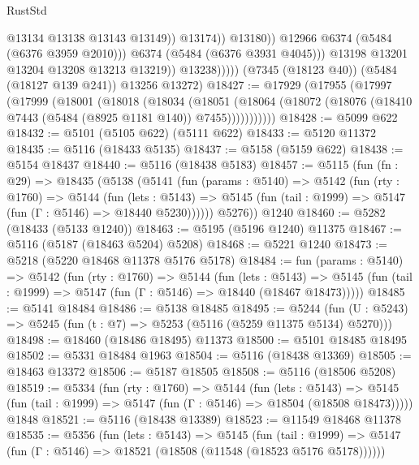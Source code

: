 \begin{lexlean}{RustStd}
\begin{coremodule}
{\begin{coremodule}
{{{{{{{{{{{{{{{{{{{{{{{{{{{{{{{                                    @13134
                                    @13138
                                    @13143
                                    @13149))
                                @13174))
                            @13180))
                        @12966
                        @6374
                        (@5484 (@6376 @3959 @2010)))
                      @6374
                      (@5484 (@6376 @3931 @4045)))
                    @13198
                    @13201
                    @13204
                    @13208
                    @13213
                    @13219))
                @13238)))))
      (@7345 (@18123 @40))
      (@5484 (@18127 @139 @241))
      @13256
      @13272)
@18427 := @17929
    (@17955
      (@17997
        (@17999
          (@18001
            (@18018
              (@18034
                (@18051
                  (@18064 (@18072 (@18076 (@18410 @7443 (@5484 (@8925 @1181 @140)) @7455)))))))))))
@18428 := @5099 @622
@18432 := @5101 (@5105 @622) (@5111 @622)
@18433 := @5120 @11372
@18435 := @5116 (@18433 @5135)
@18437 := @5158 (@5159 @622)
@18438 := @5154 @18437
@18440 := @5116 (@18438 @5183)
@18457 := @5115
    (fun (fn : @29) =>
    @18435
      (@5138
        (@5141
          (fun (params : @5140) =>
          @5142
            (fun (rty : @1760) =>
            @5144
              (fun (lets : @5143) =>
              @5145 (fun (tail : @1999) => @5147 (fun (Γ : @5146) => @18440 @5230))))))
        @5276))
    @1240
@18460 := @5282 (@18433 (@5133 @1240))
@18463 := @5195 (@5196 @1240) @11375
@18467 := @5116 (@5187 (@18463 @5204) @5208)
@18468 := @5221 @1240
@18473 := @5218 (@5220 @18468 @11378 @5176 @5178)
@18484 := fun (params : @5140) =>
  @5142
    (fun (rty : @1760) =>
    @5144
      (fun (lets : @5143) =>
      @5145 (fun (tail : @1999) => @5147 (fun (Γ : @5146) => @18440 (@18467 @18473)))))
@18485 := @5141 @18484
@18486 := @5138 @18485
@18495 := @5244
    (fun (U : @5243) => @5245 (fun (t : @7) => @5253 (@5116 (@5259 @11375 @5134) @5270)))
@18498 := @18460 (@18486 @18495) @11373
@18500 := @5101 @18485 @18495
@18502 := @5331 @18484 @1963
@18504 := @5116 (@18438 @13369)
@18505 := @18463 @13372
@18506 := @5187 @18505
@18508 := @5116 (@18506 @5208)
@18519 := @5334
    (fun (rty : @1760) =>
    @5144
      (fun (lets : @5143) =>
      @5145 (fun (tail : @1999) => @5147 (fun (Γ : @5146) => @18504 (@18508 @18473)))))
    @1848
@18521 := @5116 (@18438 @13389)
@18523 := @11549 @18468 @11378
@18535 := @5356
    (fun (lets : @5143) =>
    @5145
      (fun (tail : @1999) =>
      @5147 (fun (Γ : @5146) => @18521 (@18508 (@11548 (@18523 @5176 @5178))))))
}}}}}}}}}}}}}}}}}}}}}}}}}}}}}}}
\end{coremodule}}
\end{coremodule}
\end{lexlean}
